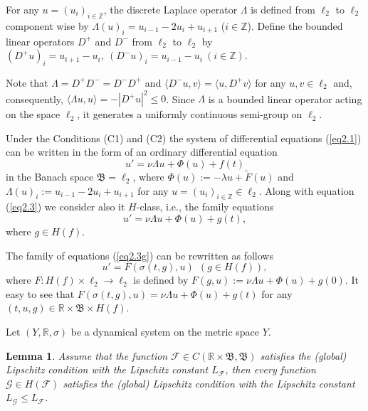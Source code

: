 \documentclass{amsart}%
\newtheorem{lemma}{Lemma}[section]
\begin{document}
For any $u = (u_{i})_{i\in \mathbb Z}$, the discrete Laplace
operator $\Lambda$ is defined \cite[Ch.III]{HK_2023} from
$\ell_{2}$ to $\ell_{2}$ component wise by $\Lambda(u)_{i} =
u_{i-1} - 2u_{i} + u_{i+1}$ ($i\in \mathbb Z$). Define the
bounded linear operators $D^{+}$ and $D^{-}$ from $\ell_{2}$ to
$\ell_{2}$ by $(D^{+}u)_{i} = u_{i+1} - u_{i},\ (D^{-}u)_{i} =
u_{i-1} - u_{i}\ (i\in \mathbb Z)$.

Note that $\Lambda = D^{+}D^{-} = D^{-}D^{+}$ and $\langle D^{-}u,
v\rangle = \langle u, D^{+}v\rangle $ for any $u,v\in \ell_{2}$
and, consequently, $\langle \Lambda u,u \rangle = -|D^{+}u|^{2}\le
0$. Since $\Lambda$ is a bounded linear operator acting on the
space $\ell_{2}$, it generates a uniformly continuous semi-group
on $\ell_{2}$.

Under the Conditions (C1) and (C2) the system of differential
equations (\ref{eq2.1}) can be written in the form of an ordinary
differential equation
\begin{equation}\label{eq2.3}
u'=\nu \Lambda u +\Phi (u)+f(t)
\end{equation}
in the Banach space $\mathfrak B=\ell_{2}$, where
$\Phi(u):=-\lambda u +\widetilde{F} (u)$ and
$\Lambda(u)_{i}:=u_{i-1}-2u_{i}+u_{i+1}$ for any $u=(u_i)_{i\in
\mathbb Z}\in \ell_{2}$. Along with equation (\ref{eq2.3}) we
consider also it $H$-class, i.e., the family equations
\begin{equation}\label{eq2.3g}
u'=\nu \Lambda u +\Phi (u)+g(t),
\end{equation}
where $g\in H(f)$.

The family of equations (\ref{eq2.3g}) can be rewritten as follows
\begin{equation}\label{eq2.3H}
u'=F(\sigma(t,g),u)\ \ (g\in H(f)),
\end{equation}
where $F:H(f)\times \ell_{2}\to \ell_{2}$ is defined by
$F(g,u):=\nu \Lambda u+\Phi (u) +g(0)$. It easy to see that
$F(\sigma(t,g),u)=\nu \Lambda u+\Phi (u)+g(t)$ for any $(t,u,g)\in
\mathbb R\times \mathfrak B \times H(f)$.

Let $(Y,\mathbb R,\sigma)$ be a dynamical system on the metric
space $Y$.

\begin{lemma}\label{l2.3}\cite{Che_2015} Assume that the function
$\mathcal F \in C(\mathbb R\times \mathfrak B,\mathfrak B)$
satisfies the (global) Lipschitz condition with the Lipschitz
constant $L_{\mathcal F}$, then every function $\mathcal G\in
H(\mathcal F)$ satisfies the (global) Lipschitz condition with the
Lipschitz constant $L_{\mathcal G}\le L_{\mathcal F}$.
\end{lemma}
\end{document}
